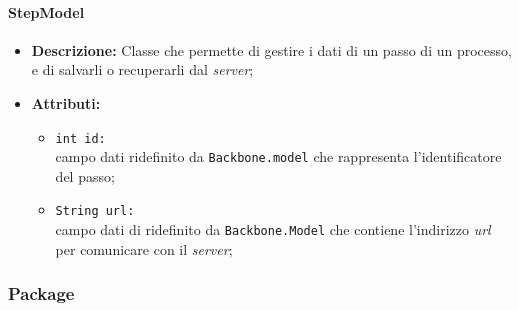 \paragraph{StepModel}
\label{stepModel}
\begin{flushleft}
\begin{itemize}
\item \textbf{Descrizione:} Classe che permette di gestire i dati di un passo di un processo, e di salvarli o recuperarli dal \textit{server};
\item \textbf{Attributi:}
\begin{sloppypar}
\begin{itemize}
\item \texttt{int id:}\\ campo dati ridefinito da \texttt{Backbone.model} che rappresenta l'identificatore del passo;
\item \texttt{String url:}\\ campo dati di ridefinito da \texttt{Backbone.Model} che contiene l'indirizzo \textit{url} per comunicare con il \textit{server};
\end{itemize}
\end{sloppypar}
\end{itemize}
\end{flushleft}

\subsubsection{Package \collection{}}

